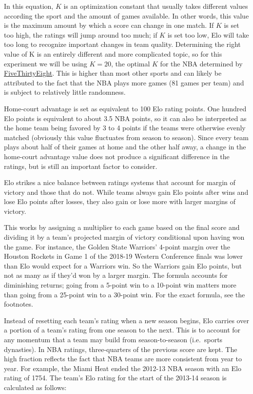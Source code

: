 \documentclass[]{article}
\begin{document}
In this equation, \(K\) is an optimization constant that usually takes
different values according the sport and the amount of games available.
In other words, this value is the maximum amount by which a score can
change in one match. If \(K\) is set too high, the ratings will jump
around too much; if \(K\) is set too low, Elo will take too long to
recognize important changes in team quality. Determining the right value
of K is an entirely different and more complicated topic, so for this
experiment we will be using \(K=20\), the optimal \(K\) for the NBA
determined by
\href{https://fivethirtyeight.com/features/how-we-calculate-nba-elo-ratings/}{FiveThirtyEight}.
This is higher than most other sports and can likely be attributed to
the fact that the NBA plays more games (81 games per team) and is
subject to relatively little randomness.

Home-court advantage is set as equivalent to 100 Elo rating points. One
hundred Elo points is equivalent to about 3.5 NBA points, so it can also
be interpreted as the home team being favored by 3 to 4 points if the
teams were otherwise evenly matched (obviously this value fluctuates
from season to season). Since every team plays about half of their games
at home and the other half away, a change in the home-court advantage
value does not produce a significant difference in the ratings, but is
still an important factor to consider.

Elo strikes a nice balance between ratings systems that account for
margin of victory and those that do not. While teams always gain Elo
points after wins and lose Elo points after losses, they also gain or
lose more with larger margins of victory.

This works by assigning a multiplier to each game based on the final
score and dividing it by a team's projected margin of victory
conditional upon having won the game. For instance, the Golden State
Warriors' 4-point margin over the Houston Rockets in Game 1 of the
2018-19 Western Conference finals was lower than Elo would expect for a
Warriors win. So the Warriors gain Elo points, but not as many as if
they'd won by a larger margin. The formula accounts for diminishing
returns; going from a 5-point win to a 10-point win matters more than
going from a 25-point win to a 30-point win. For the exact formula, see
the footnotes.

Instead of resetting each team's rating when a new season begins, Elo
carries over a portion of a team's rating from one season to the next.
This is to account for any momentum that a team may build from
season-to-season (i.e.~sports dynasties). In NBA ratings, three-quarters
of the previous score are kept. The high fraction reflects the fact that
NBA teams are more consistent from year to year. For example, the Miami
Heat ended the 2012-13 NBA season with an Elo rating of 1754. The team's
Elo rating for the start of the 2013-14 season is calculated as follows:
\end{document}
